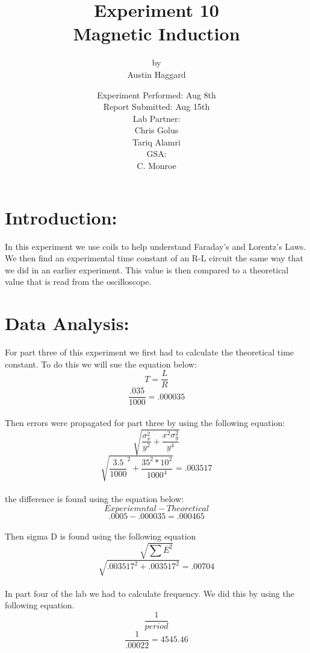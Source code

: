 \documentclass{article}
\title{Experiment 10 \\ Magnetic Induction}
\author{by \\ Austin Haggard}
\date{
	Experiment Performed: Aug 8th \\
	Report Submitted: Aug 15th \\[11pt]
	Lab Partner: \\ Chris Golus \\ Tariq Alamri \\[11pt] 
	GSA: \\ C. Monroe
}
\begin{document}
\maketitle
\thispagestyle{empty}
\newpage

\section*{Introduction:}
\setcounter{page}{1}
In this experiment we use coils to help understand Faraday's and Lorentz's Laws.  We then find an experimental time constant of an R-L circuit the same way that we did in an earlier experiment.  This value is then compared to a theoretical value that is read from the oscilloscope.
\newpage


\section*{Data Analysis:}
\setcounter{page}{3}
For part three of this experiment we first had to calculate the theoretical time constant.  To do this we will sue the equation below:
\[T = \frac{L}{R}\]
\[\frac{.035}{1000} = .000035\]
\\
Then errors were propagated for part three by using the following equation:
\[\sqrt{\frac{\sigma^2_x}{y^2} + \frac{x^2\sigma^2_y}{y^4}}\]
\[\sqrt{\frac{3.5}{1000}^2+\frac{35^2*10^2}{1000^4}} = .003517\]
\\
the difference is found using the equation below:
\[Experiemntal - Theoretical\]
\[.0005 - .000035 = .000465\]
\\
Then sigma D is found using the following equation
\[\sqrt{\sum{E^2}}\]
\[\sqrt{.003517^2 + .003517^2} = .00704\]
\\
In part four of the lab we had to calculate frequency.  We did this by using the following equation.
\[\frac{1}{period}\]
\[\frac{1}{.00022} = 4545.46\]
\end{document}

